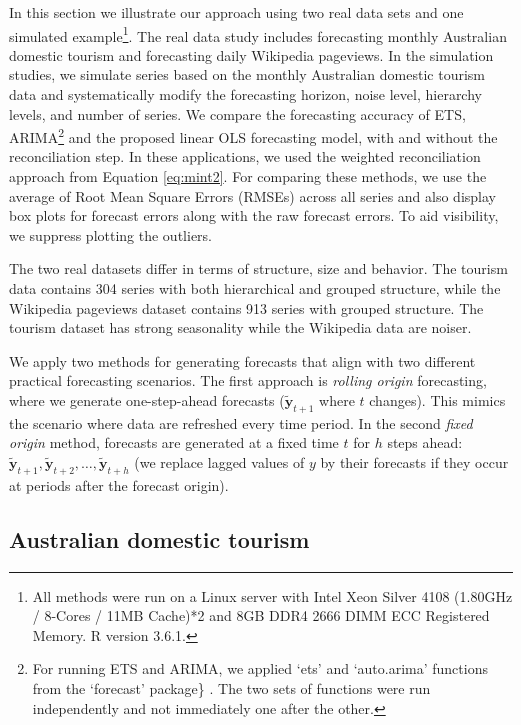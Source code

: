 \documentclass[11pt,a4paper,]{article}
\begin{document}
In this section we illustrate our approach using two real data sets and one simulated example\footnote{All methods were run on a Linux server with Intel Xeon Silver 4108 (1.80GHz / 8-Cores / 11MB Cache)*2 and 8GB DDR4 2666 DIMM ECC Registered Memory. R version 3.6.1.}. The real data study includes forecasting monthly Australian domestic tourism and forecasting daily Wikipedia pageviews. In the simulation studies, we simulate series based on the monthly Australian domestic tourism data and systematically modify the forecasting horizon, noise level, hierarchy levels, and number of series. We compare the forecasting accuracy of ETS, ARIMA\footnote{For running ETS and ARIMA, we applied `ets' and `auto.arima' functions from the `forecast' package\} \autocite{Rforecast}. The two sets of functions were run independently and not immediately one after the other.} and the proposed linear OLS forecasting model, with and without the reconciliation step. In these applications, we used the weighted reconciliation approach from Equation \eqref{eq:mint2}. For comparing these methods, we use the average of Root Mean Square Errors (RMSEs) across all series and also display box plots for forecast errors along with the raw forecast errors. To aid visibility, we suppress plotting the outliers.

The two real datasets differ in terms of structure, size and behavior. The tourism data contains 304 series with both hierarchical and grouped structure, while the Wikipedia pageviews dataset contains 913 series with grouped structure. The tourism dataset has strong seasonality while the Wikipedia data are noiser.

We apply two methods for generating forecasts that align with two different practical forecasting scenarios. The first approach is \emph{rolling origin} forecasting, where we generate one-step-ahead forecasts (\(\tilde{\bm{y}}_{t+1}\) where \(t\) changes). This mimics the scenario where data are refreshed every time period. In the second \emph{fixed origin} method, forecasts are generated at a fixed time \(t\) for \(h\) steps ahead: \(\tilde{\bm{y}}_{t+1}, \tilde{\bm{y}}_{t+2},\dots, \tilde{\bm{y}}_{t+h}\) (we replace lagged values of \(y\) by their forecasts if they occur at periods after the forecast origin).

\hypertarget{australian-domestic-tourism}{%
\subsection{Australian domestic tourism}\label{australian-domestic-tourism}}
\end{document}

